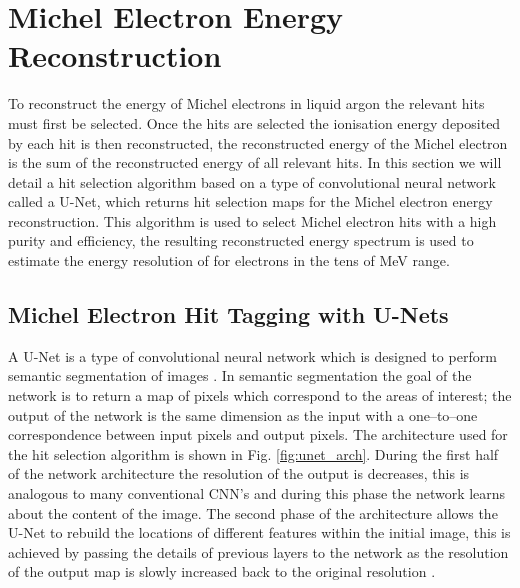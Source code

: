 
\section{Michel Electron Energy Reconstruction} \label{ME_R} 

To reconstruct the energy of Michel electrons in liquid argon the relevant hits
must first be selected. Once the hits are selected the ionisation energy
deposited by each hit is then reconstructed, the reconstructed energy of the 
Michel electron is the sum of the reconstructed energy of all relevant hits. In
this section we will detail a hit selection algorithm based on a type of
convolutional neural network called a U-Net, which returns hit selection maps 
for the Michel electron energy reconstruction. This algorithm is used to select 
Michel electron hits with a high purity and efficiency, the resulting 
reconstructed energy spectrum is used to estimate the energy resolution of 
\protodune{} for electrons in the tens of MeV range.

\subsection{Michel Electron Hit Tagging with U-Nets}

A U-Net is a type of convolutional neural network which is designed to perform
semantic segmentation of images \cite{TODO}. In semantic segmentation the goal
of the network is to return a map of pixels which correspond to the areas of 
interest; the output of the network is the same dimension as the input with a 
one--to--one correspondence between input pixels and output pixels. The
architecture used for the hit selection algorithm is shown in Fig.
\ref{fig:unet_arch}. During the first half of the network architecture the
resolution of the output is decreases, this is analogous to many conventional
CNN's and during this phase the network learns about the content of the image.
The second phase of the architecture allows the U-Net to rebuild the locations 
of different features within the initial image, this is achieved by passing 
the details of previous layers to the network as the resolution of the output 
map is slowly increased back to the original resolution \cite{TODO}. 

